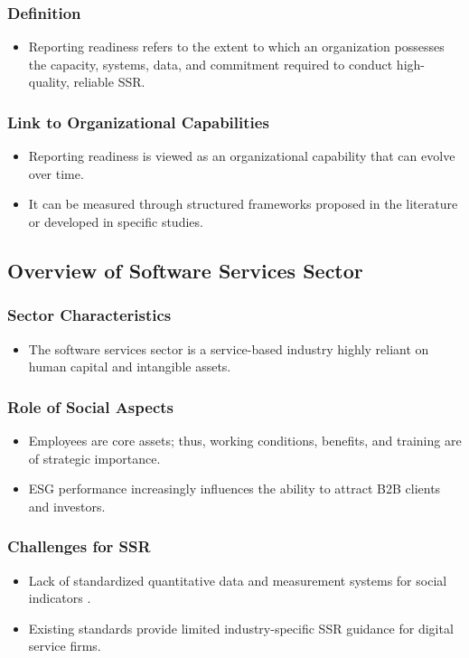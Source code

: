 \subsubsection{Definition}
\begin{itemize}
    \item Reporting readiness refers to the extent to which an organization possesses the capacity, systems, data, 
    and commitment required to conduct high-quality, reliable SSR. 
\end{itemize}

\subsubsection{Link to Organizational Capabilities}
\begin{itemize}
    \item Reporting readiness is viewed as an organizational capability that can evolve over time.
    \item It can be measured through structured frameworks proposed in the literature or developed in specific studies.
\end{itemize}

\subsection{Overview of Software Services Sector}
\subsubsection{Sector Characteristics}
\begin{itemize}
    \item The software services sector is 
    a service-based industry highly reliant on human capital and intangible assets. 
\end{itemize}

\subsubsection{Role of Social Aspects}
\begin{itemize}
    \item Employees are core assets; thus, working conditions, benefits, and training are of strategic importance. 
    \item ESG performance increasingly influences the ability to attract B2B clients and investors.
\end{itemize}

\subsubsection{Challenges for SSR}
\begin{itemize}
    \item Lack of standardized quantitative data and measurement systems for social indicators \parencite{Gibbons2024}.
    \item Existing standards provide limited industry-specific SSR guidance for digital service firms.
\end{itemize}

